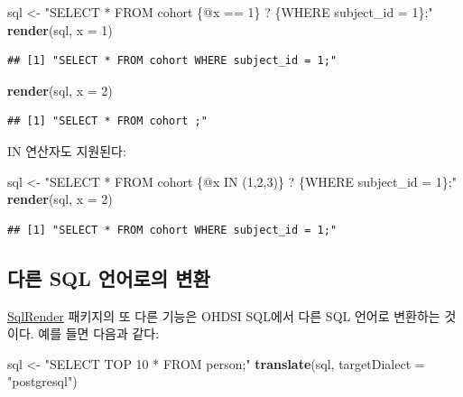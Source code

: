 \documentclass[11pt]{book}
\newenvironment{Shaded}{\begin{snugshade}}{\end{snugshade}}
\newcommand{\KeywordTok}[1]{\textcolor[rgb]{0.13,0.29,0.53}{\textbf{#1}}}
\newcommand{\DataTypeTok}[1]{\textcolor[rgb]{0.13,0.29,0.53}{#1}}
\newcommand{\DecValTok}[1]{\textcolor[rgb]{0.00,0.00,0.81}{#1}}
\newcommand{\StringTok}[1]{\textcolor[rgb]{0.31,0.60,0.02}{#1}}
\newcommand{\NormalTok}[1]{#1}
\theoremstyle{definition}
\theoremstyle{definition}
\theoremstyle{definition}
\theoremstyle{remark}
\begin{document}
\begin{Shaded}
\begin{Highlighting}[]
\NormalTok{sql <-}\StringTok{ "SELECT * FROM cohort \{@x == 1\} ? \{WHERE subject_id = 1\};"}
\KeywordTok{render}\NormalTok{(sql, }\DataTypeTok{x =} \DecValTok{1}\NormalTok{)}
\end{Highlighting}
\end{Shaded}

\begin{verbatim}
## [1] "SELECT * FROM cohort WHERE subject_id = 1;"
\end{verbatim}

\begin{Shaded}
\begin{Highlighting}[]
\KeywordTok{render}\NormalTok{(sql, }\DataTypeTok{x =} \DecValTok{2}\NormalTok{)}
\end{Highlighting}
\end{Shaded}

\begin{verbatim}
## [1] "SELECT * FROM cohort ;"
\end{verbatim}

IN 연산자도 지원된다:

\begin{Shaded}
\begin{Highlighting}[]
\NormalTok{sql <-}\StringTok{ "SELECT * FROM cohort \{@x IN (1,2,3)\} ? \{WHERE subject_id = 1\};"}
\KeywordTok{render}\NormalTok{(sql, }\DataTypeTok{x =} \DecValTok{2}\NormalTok{)}
\end{Highlighting}
\end{Shaded}

\begin{verbatim}
## [1] "SELECT * FROM cohort WHERE subject_id = 1;"
\end{verbatim}

\subsection{다른 SQL 언어로의 변환}\label{-sql--}

\href{https://ohdsi.github.io/SqlRender/}{SqlRender} 패키지의 또 다른
기능은 OHDSI SQL에서 다른 SQL 언어로 변환하는 것이다. 예를 들면 다음과
같다:

\begin{Shaded}
\begin{Highlighting}[]
\NormalTok{sql <-}\StringTok{ "SELECT TOP 10 * FROM person;"}
\KeywordTok{translate}\NormalTok{(sql, }\DataTypeTok{targetDialect =} \StringTok{"postgresql"}\NormalTok{)}
\end{Highlighting}
\end{Shaded}
\end{document}
